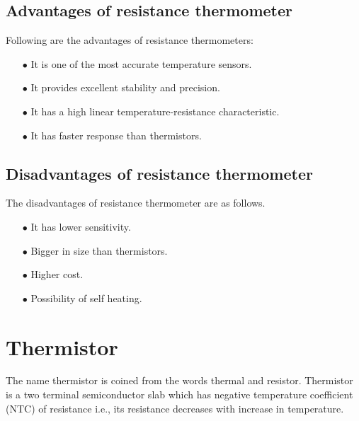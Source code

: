 \subsection{Advantages of resistance thermometer}\label{sec8.8.2}

Following are the advantages of resistance thermometers:
\begin{itemize}
\item[$\bullet$] It is one of the most accurate temperature sensors.

\item[$\bullet$] It provides excellent stability and precision. 

\item[$\bullet$] It has a high linear temperature-resistance characteristic.

\item[$\bullet$] It has faster response than thermistors. 
\end{itemize}

\subsection{Disadvantages of resistance thermometer}\label{sec8.8.3}

The disadvantages of resistance thermometer are as follows.
\begin{itemize}
\item[$\bullet$] It has lower sensitivity.

\item[$\bullet$] Bigger in size than thermistors.

\item[$\bullet$] Higher cost.

\item[$\bullet$] Possibility of self heating.
\end{itemize}

\section{Thermistor}\label{sec8.9}

The name thermistor is coined from the words thermal and resistor. Thermistor is a two terminal semiconductor slab which has negative temperature coefficient (NTC) of resistance i.e., its resistance decreases with increase in temperature.


